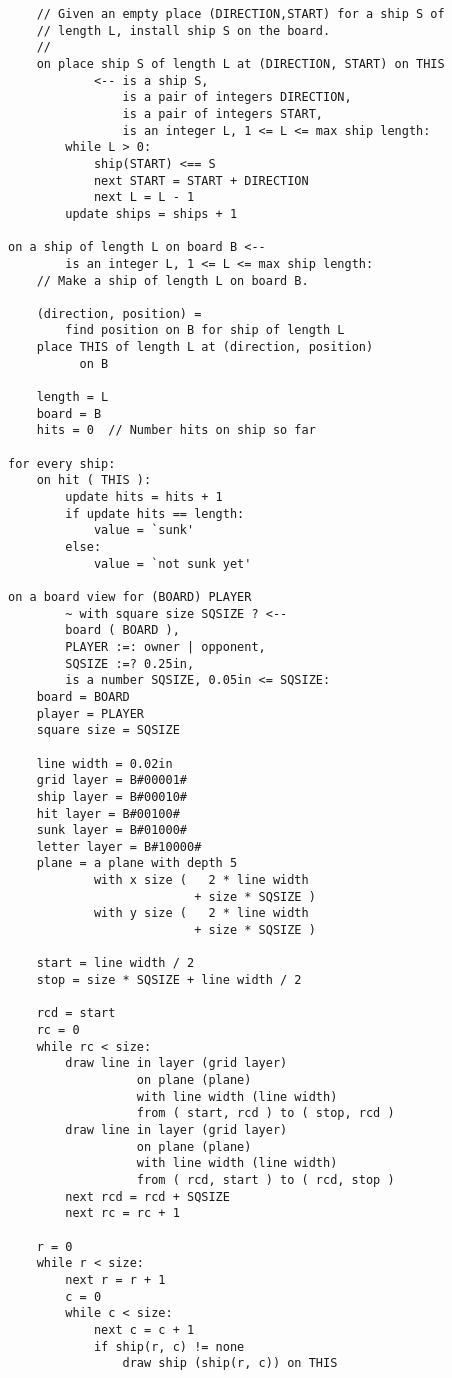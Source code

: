 \documentclass[12pt]{article}
\begin{document}
\begin{verbatim}
    // Given an empty place (DIRECTION,START) for a ship S of
    // length L, install ship S on the board.
    //
    on place ship S of length L at (DIRECTION, START) on THIS
            <-- is a ship S,
                is a pair of integers DIRECTION,
                is a pair of integers START,
                is an integer L, 1 <= L <= max ship length:
        while L > 0:
            ship(START) <== S
            next START = START + DIRECTION
            next L = L - 1
        update ships = ships + 1
    
on a ship of length L on board B <--
        is an integer L, 1 <= L <= max ship length:
    // Make a ship of length L on board B.

    (direction, position) =
        find position on B for ship of length L
    place THIS of length L at (direction, position)
          on B

    length = L
    board = B
    hits = 0  // Number hits on ship so far

for every ship:
    on hit ( THIS ):
        update hits = hits + 1
        if update hits == length:
            value = `sunk'
        else:
            value = `not sunk yet'

on a board view for (BOARD) PLAYER
        ~ with square size SQSIZE ? <--
        board ( BOARD ),
        PLAYER :=: owner | opponent,
        SQSIZE :=? 0.25in,
        is a number SQSIZE, 0.05in <= SQSIZE:
    board = BOARD
    player = PLAYER
    square size = SQSIZE

    line width = 0.02in
    grid layer = B#00001#
    ship layer = B#00010#
    hit layer = B#00100#
    sunk layer = B#01000#
    letter layer = B#10000#
    plane = a plane with depth 5
            with x size (   2 * line width 
                          + size * SQSIZE )
            with y size (   2 * line width 
                          + size * SQSIZE )

    start = line width / 2
    stop = size * SQSIZE + line width / 2

    rcd = start
    rc = 0
    while rc < size:
        draw line in layer (grid layer)
                  on plane (plane)
                  with line width (line width)
                  from ( start, rcd ) to ( stop, rcd )
        draw line in layer (grid layer)
                  on plane (plane)
                  with line width (line width)
                  from ( rcd, start ) to ( rcd, stop )
        next rcd = rcd + SQSIZE
        next rc = rc + 1

    r = 0
    while r < size:
        next r = r + 1
        c = 0
        while c < size:
            next c = c + 1
            if ship(r, c) != none
                draw ship (ship(r, c)) on THIS


\end{verbatim}
\end{document}
